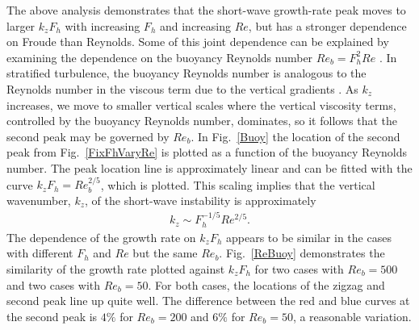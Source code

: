 The above analysis demonstrates that the short-wave growth-rate peak moves to larger $k_{z}F_{h}$ with increasing $F_{h}$ and increasing $Re$, but has a stronger dependence on Froude than Reynolds. Some of this joint dependence can be explained by examining the dependence on the buoyancy Reynolds number $Re_{b}=F_{h}^{2}Re$ \cite{riley2003,hebert2006,brethouwer2007}. In stratified turbulence, the buoyancy Reynolds number is analogous to the Reynolds number in the viscous term due to the vertical gradients \cite{brethouwer2007}. As $k_{z}$ increases, we move to smaller vertical scales where the vertical viscosity terms, controlled by the buoyancy Reynolds number, dominates, so it follows that the second peak may be governed by $Re_{b}$. In Fig.~\ref{Buoy} the location of the second peak from Fig.~\ref{FixFhVaryRe} is plotted as a function of the buoyancy Reynolds number. The peak location line is approximately linear and can be fitted with the curve $k_{z}F_{h}= Re_{b}^{2/5}$, which is plotted. This scaling implies that the vertical wavenumber, $k_{z}$, of the short-wave instability is approximately 
\begin{align}
k_{z} \sim F_{h}^{-1/5} Re^{2/5}\label{buoyscale}.
\end{align} 
The dependence of the growth rate on $k_{z}F_{h}$ appears to be similar in the cases with different $F_{h}$ and $Re$ but the same $Re_{b}$. Fig.~\ref{ReBuoy} demonstrates the similarity of the growth rate plotted against $k_{z}F_{h}$ for two cases with $Re_{b}=500$ and two cases with $Re_{b}=50$. For both cases, the locations of the zigzag and second peak line up quite well. The difference between the red and blue curves at the second peak is $4\%$ for $Re_{b}=200$ and $6\%$ for $Re_{b}=50$, a reasonable variation. 

